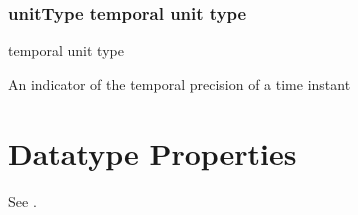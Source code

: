 \documentclass[letterpaper,10pt,english]{sphinxmanual}
\begin{document}
\subsection{unitType \sphinxhyphen{} temporal unit type}
\label{\detokenize{doc-unitType:unittype-temporal-unit-type}}\label{\detokenize{doc-unitType:index-0}}\label{\detokenize{doc-unitType::doc}}
\begin{sphinxShadowBox}

\sphinxAtStartPar
temporal unit type
\end{sphinxShadowBox}

\begin{sphinxShadowBox}

\sphinxAtStartPar
{}
\end{sphinxShadowBox}

\begin{sphinxShadowBox}

\sphinxAtStartPar
An indicator of the temporal precision of a time instant
\end{sphinxShadowBox}

\begin{sphinxShadowBox}

\sphinxAtStartPar
{}
\end{sphinxShadowBox}


\chapter{Datatype Properties}
\label{\detokenize{datatype-properties:datatype-properties}}\label{\detokenize{datatype-properties::doc}}
\sphinxAtStartPar
See {\hyperref[\detokenize{datatype-properties:table-8}]{}}.
\end{document}
